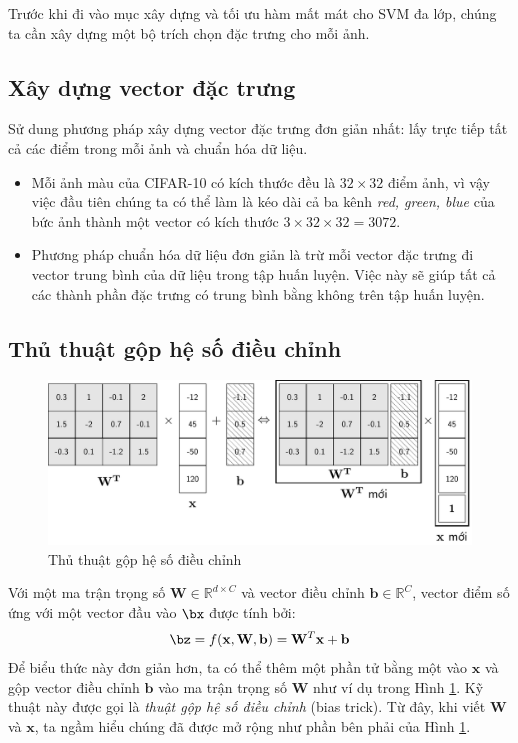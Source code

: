 Trước khi đi vào mục xây dựng và tối ưu hàm mất mát cho SVM đa lớp, chúng ta cần xây dựng một bộ trích chọn đặc trưng cho mỗi ảnh. 
 
\subsection{Xây dựng vector đặc trưng}
Sử dung phương pháp xây dựng vector đặc trưng đơn giản nhất: lấy
trực tiếp tất cả các điểm trong mỗi ảnh và chuẩn hóa dữ liệu.
\begin{itemize}
    \item Mỗi ảnh {màu} của CIFAR-10 có kích thước đều là $32
    \times 32$ điểm ảnh, vì vậy việc đầu tiên chúng ta có thể làm là {kéo dài} cả ba kênh \textit{red, green, blue} của bức ảnh thành một vector có kích thước $3 \times 32 \times 32 = 3072$.
     
    \item Phương pháp chuẩn hóa dữ liệu đơn giản là trừ mỗi vector đặc trưng đi vector trung bình của dữ liệu trong tập huấn luyện. Việc này sẽ giúp tất cả các thành phần đặc trưng có trung bình bằng không trên tập huấn luyện. 
 
\end{itemize}
 
\subsection{Thủ thuật gộp hệ số điều chỉnh}
\begin{figure}[t]
    \centering
        \includegraphics[width = \textwidth]{Chapters/09_SupportVectorMachines/22_multiclasssvm/latex/biastrick.pdf}
        \caption[]{Thủ thuật gộp hệ số điều chỉnh}
        \label{fig:22_3}
    \end{figure} 

Với một ma trận trọng số $\mathbf{W} \in \mathbb{R}^{d\times C}$ và vector điều chỉnh $\mathbf{b} \in \mathbb{R}^C$, vector điểm số ứng với một vector đầu vào $\bx$ được tính bởi:
\begin{equation} 
\bz = f(\mathbf{x}, \mathbf{W}, \mathbf{b}) = \mathbf{W}^T\mathbf{x} + \mathbf{b} 
\end{equation} 
Để biểu thức này đơn giản hơn, ta có thể thêm một phần tử bằng một vào $\mathbf{x}$ và {gộp} vector điều chỉnh $\mathbf{b}$ vào ma trận trọng số $\mathbf{W}$
như ví dụ trong Hình \ref{fig:22_3}. Kỹ thuật này được gọi là \textit{thuật gộp hệ số điều chỉnh} (bias trick). Từ đây, khi viết
$\mathbf{W}$ và $\mathbf{x}$, ta ngầm hiểu chúng đã được mở rộng như
phần bên phải của Hình \ref{fig:22_3}.

